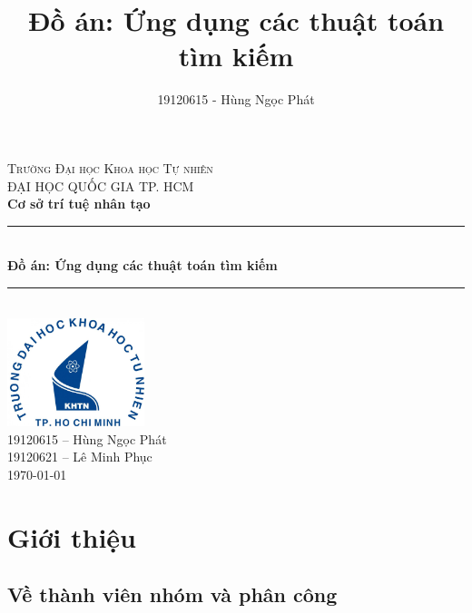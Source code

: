 \documentclass{report}
\title{Đồ án: Ứng dụng các thuật toán tìm kiếm}
\author{19120615 - Hùng Ngọc Phát}
\begin{document}
    

\begin{titlepage}
    \vspace*{\fill}

    \centering
    \textsc{\LARGE Trường Đại học Khoa học Tự nhiên}\\[0.5cm]
    \textsc{\large ĐẠI HỌC QUỐC GIA TP. HCM}\\[1.5cm]
    
    {\LARGE\bfseries Cơ sở trí tuệ nhân tạo}\\[1.5cm]

    \rule{\textwidth}{0.4pt} \\[0.4cm]
    {
        \huge \bfseries Đồ án: Ứng dụng các thuật toán tìm kiếm
    }
    \rule{\textwidth}{0.4pt}\\[1.5cm]

    \includegraphics[width=0.3\textwidth]{images/khtn.jpg}\\[1.5cm]
    
    {\Large 19120615 -- Hùng Ngọc Phát \\ 19120621 -- Lê Minh Phục}\\[0.5cm]

    {\large \monthyeardate\today}  
    
    \vspace*{\fill}

\end{titlepage}


    \tableofcontents


    
\hypertarget{giux1edbi-thiux1ec7u}{%
\chapter{Giới thiệu}\label{giux1edbi-thiux1ec7u}}

\hypertarget{vux1ec1-thuxe0nh-viuxean-nhuxf3m-vuxe0-phuxe2n-cuxf4ng}{%
\section{Về thành viên nhóm và phân
công}\label{vux1ec1-thuxe0nh-viuxean-nhuxf3m-vuxe0-phuxe2n-cuxf4ng}}
\end{document}
